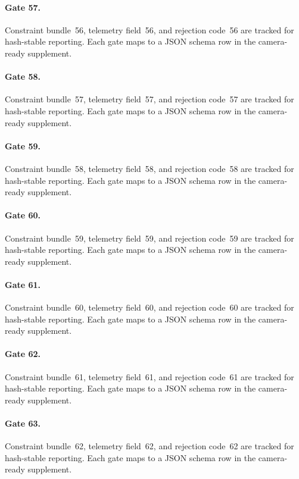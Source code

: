 \documentclass[sigconf,nonacm]{acmart}
\begin{document}
\paragraph{Gate 57.}
Constraint bundle~56, telemetry field~56, and rejection code~56 are tracked for hash-stable reporting. Each gate maps to a JSON schema row in the camera-ready supplement. %

\paragraph{Gate 58.}
Constraint bundle~57, telemetry field~57, and rejection code~57 are tracked for hash-stable reporting. Each gate maps to a JSON schema row in the camera-ready supplement. %

\paragraph{Gate 59.}
Constraint bundle~58, telemetry field~58, and rejection code~58 are tracked for hash-stable reporting. Each gate maps to a JSON schema row in the camera-ready supplement. %

\paragraph{Gate 60.}
Constraint bundle~59, telemetry field~59, and rejection code~59 are tracked for hash-stable reporting. Each gate maps to a JSON schema row in the camera-ready supplement. %

\paragraph{Gate 61.}
Constraint bundle~60, telemetry field~60, and rejection code~60 are tracked for hash-stable reporting. Each gate maps to a JSON schema row in the camera-ready supplement. %

\paragraph{Gate 62.}
Constraint bundle~61, telemetry field~61, and rejection code~61 are tracked for hash-stable reporting. Each gate maps to a JSON schema row in the camera-ready supplement. %

\paragraph{Gate 63.}
Constraint bundle~62, telemetry field~62, and rejection code~62 are tracked for hash-stable reporting. Each gate maps to a JSON schema row in the camera-ready supplement. %
\end{document}
